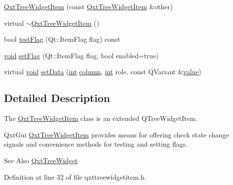\begin{DoxyCompactItemize}
\item 
\hyperlink{class_qxt_tree_widget_item_a693bccbbe2109b3c4ea597a08f859d1d}{Qxt\-Tree\-Widget\-Item} (const \hyperlink{class_qxt_tree_widget_item}{Qxt\-Tree\-Widget\-Item} \&other)
\item 
virtual \hyperlink{class_qxt_tree_widget_item_ae5e1e7d03af83a998077cc59781cebfb}{$\sim$\-Qxt\-Tree\-Widget\-Item} ()
\item 
bool \hyperlink{class_qxt_tree_widget_item_acdb14e37aa975304faf3411bfd9bc757}{test\-Flag} (Qt\-::\-Item\-Flag flag) const 
\item 
\hyperlink{group___u_a_v_objects_plugin_ga444cf2ff3f0ecbe028adce838d373f5c}{void} \hyperlink{class_qxt_tree_widget_item_aa1bbe7c560845660de10e821da344add}{set\-Flag} (Qt\-::\-Item\-Flag flag, bool enabled=true)
\item 
virtual \hyperlink{group___u_a_v_objects_plugin_ga444cf2ff3f0ecbe028adce838d373f5c}{void} \hyperlink{class_qxt_tree_widget_item_a68caaddf8469c06dbe3a01e80ee8a66a}{set\-Data} (\hyperlink{ioapi_8h_a787fa3cf048117ba7123753c1e74fcd6}{int} \hyperlink{glext_8h_a3b58c39b1b7ca6f4012b27e84de3bdb3}{column}, \hyperlink{ioapi_8h_a787fa3cf048117ba7123753c1e74fcd6}{int} role, const Q\-Variant \&\hyperlink{glext_8h_aa0e2e9cea7f208d28acda0480144beb0}{value})
\end{DoxyCompactItemize}


\subsection{Detailed Description}
The \hyperlink{class_qxt_tree_widget_item}{Qxt\-Tree\-Widget\-Item} class is an extended Q\-Tree\-Widget\-Item. 

Qxt\-Gui \hyperlink{class_qxt_tree_widget_item}{Qxt\-Tree\-Widget\-Item} provides means for offering check state change signals and convenience methods for testing and setting flags.

\begin{DoxySeeAlso}{See Also}
\hyperlink{class_qxt_tree_widget}{Qxt\-Tree\-Widget} 
\end{DoxySeeAlso}


Definition at line 32 of file qxttreewidgetitem.\-h.



